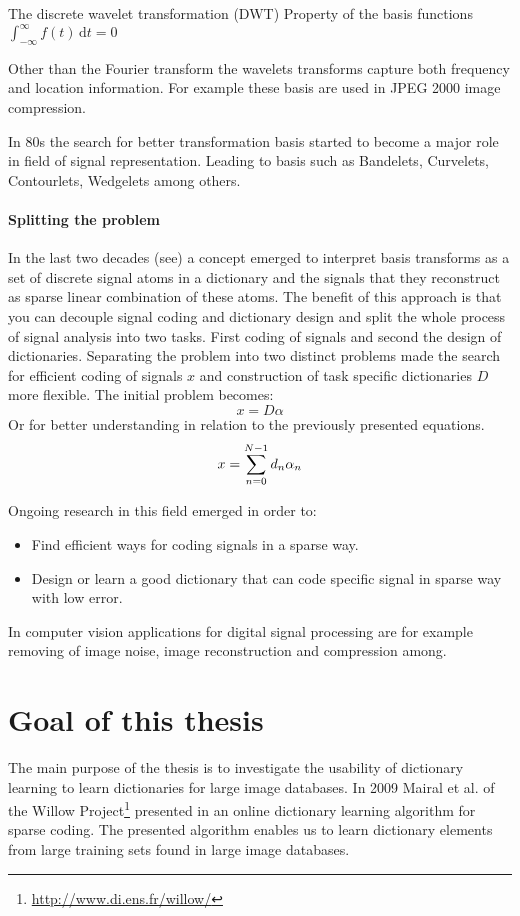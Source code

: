 The discrete wavelet transformation (DWT)
\Todo{}
 Property of the basis functions 
$\int_{-\infty}^{\infty} \! f(t) \, \mathrm{d}t = 0$

Other than the Fourier transform the wavelets transforms capture both frequency
and location information. For example these basis are used in JPEG 2000 image
compression.

In 80s the search for better transformation basis started to become a major role
in field of signal representation. Leading to basis such as Bandelets,
Curvelets, Contourlets, Wedgelets among others.

\paragraph{Splitting the problem}
\cite{Rubinstein2010}
In the last two decades (see\cite{Olshausen1996,Mallat1993}) a concept emerged
to interpret basis transforms as a set of discrete signal atoms in a dictionary
and the signals that they reconstruct as sparse linear combination of these
atoms. The benefit of this approach is that you can decouple signal coding and
dictionary design and split the whole process of signal analysis into two tasks.
First coding of signals and second the design of dictionaries. Separating the
problem into two distinct problems made the search for efficient coding of
signals $x$ and construction of task specific dictionaries $D$ more
flexible. The initial problem becomes:
\begin{equation}
 x  = D\alpha
\end{equation}
Or for better understanding in relation to the previously presented
equations.
\begin{equation}
x = \sum_{n=0}^{N-1}d_n\alpha_n\notag
\end{equation}

Ongoing research in this field emerged in order to:
\begin{itemize}
 \item Find efficient ways for coding signals in a sparse way.
 \item Design or learn a good dictionary that can code specific signal in sparse
way with low error.
\end{itemize}
In computer vision applications for digital signal processing are for example
removing of image noise, image reconstruction and compression among.


\section{Goal of this thesis}
The main purpose of the thesis is to investigate the usability of dictionary
learning to learn dictionaries for large image databases. 
In 2009 Mairal et al. of the Willow
Project\footnote{\url{http://www.di.ens.fr/willow/}} presented in
\cite{Mairal2009,Mairal2010} an online dictionary learning algorithm for sparse
coding. The presented algorithm enables us to learn dictionary elements from
large training sets found in large image databases.

